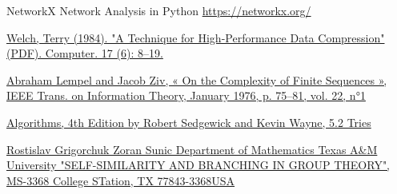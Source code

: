 \documentclass[a4paper,12pt]{amsart}
\begin{document}
\begin{thebibliography}{9}
	NetworkX Network Analysis in Python \url{https://networkx.org/}
	
	\href{https://courses.cs.duke.edu/spring03/cps296.5/papers/welch_1984_technique_for.pdf}{Welch, Terry (1984). "A Technique for High-Performance Data Compression" (PDF). Computer. 17 (6): 8–19.}
	
	\href{https://ieeexplore.ieee.org/document/1055501}{Abraham Lempel and Jacob Ziv, « On the Complexity of Finite Sequences », IEEE Trans. on Information Theory, January 1976, p. 75–81, vol. 22, n°1}
	
	\href{https://algs4.cs.princeton.edu/52trie/}{Algorithms, 4th Edition by Robert Sedgewick and Kevin Wayne, 5.2 Tries }
	
	\href{https://www.math.tamu.edu/~grigorch/publications/standrews.pdf}{Rostislav Grigorchuk Zoran Sunic Department of Mathematics Texas A\&M University "SELF-SIMILARITY AND BRANCHING IN GROUP THEORY", MS-3368 College STation, TX 77843-3368USA}
	
\end{thebibliography}

\newpage
\thispagestyle {empty}

\begin{appendices}
\end{appendices}
\end{document}
